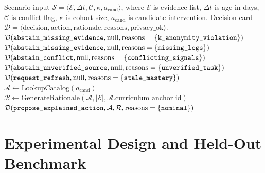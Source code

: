 \documentclass[11pt,a4paper]{article}
\begin{document}
\begin{algorithm}[H]
\caption{Evidence-Grounded Instructional Decision Policy}
\label{alg:ln09_decision_policy}
\begin{algorithmic}[1]
\REQUIRE Scenario input $\mathcal{S} = \langle \mathcal{E}, \Delta t, \mathcal{C}, \kappa, a_{\text{cand}} \rangle$, where $\mathcal{E}$ is evidence list, $\Delta t$ is age in days, $\mathcal{C}$ is conflict flag, $\kappa$ is cohort size, $a_{\text{cand}}$ is candidate intervention.
\ENSURE Decision card $\mathcal{D} = \langle \text{decision}, \text{action}, \text{rationale}, \text{reasons}, \text{privacy\_ok} \rangle$.
    \RETURN $\mathcal{D}(\text{\texttt{abstain\_missing\_evidence}}, \text{null}, \text{reasons}=\{\text{\texttt{k\_anonymity\_violation}}\})$
\ENDIF
{}
    \RETURN $\mathcal{D}(\text{\texttt{abstain\_missing\_evidence}}, \text{null}, \text{reasons}=\{\text{\texttt{missing\_logs}}\})$
\ENDIF
{}
    \RETURN $\mathcal{D}(\text{\texttt{abstain\_conflict}}, \text{null}, \text{reasons}=\{\text{\texttt{conflicting\_signals}}\})$
\ENDIF
{}
    \RETURN $\mathcal{D}(\text{\texttt{abstain\_unverified\_source}}, \text{null}, \text{reasons}=\{\text{\texttt{unverified\_task}}\})$
\ENDIF
{}
    \RETURN $\mathcal{D}(\text{\texttt{request\_refresh}}, \text{null}, \text{reasons}=\{\text{\texttt{stale\_mastery}}\})$
\ENDIF
\STATE $\mathcal{A} \leftarrow \text{LookupCatalog}(a_{\text{cand}})$
\STATE $\mathcal{R} \leftarrow \text{GenerateRationale}(\mathcal{A}, |\mathcal{E}|, \mathcal{A}.\text{curriculum\_anchor\_id})$
\RETURN $\mathcal{D}(\text{\texttt{propose\_explained\_action}}, \mathcal{A}, \mathcal{R}, \text{reasons}=\{\text{\texttt{nominal}}\})$
\end{algorithmic}
\end{algorithm}

\section{Experimental Design and Held-Out Benchmark}
\end{document}
